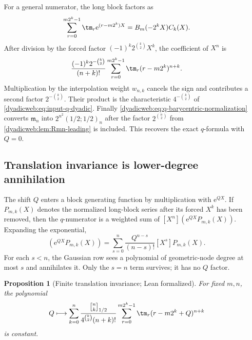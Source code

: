 \documentclass[11pt,oneside]{article}
\newtheorem{proposition}[proposition]{Proposition}
\theoremstyle{definition}
\theoremstyle{remark}
\newcommand{\e}{\mathrm e}
\newcommand{\qbinom}[3]{\genfrac{[}{]}{0pt}{}{#1}{#2}_{#3}}
\begin{document}
For a general numerator, the long block factors as
\begin{equation}
 \sum_{r=0}^{m2^k-1}\tm_r\e^{(r-m2^k)X}
 =B_m(-2^kX)C_k(X).                                       \label{dyadicweb:eq:long-block-local}
\end{equation}
After division by the forced factor
$(-1)^k2^{\binom k2}X^k$, the coefficient of $X^n$ is
\begin{equation}
 \frac{(-1)^k2^{-\binom k2}}{(n+k)!}
 \sum_{r=0}^{m2^k-1}\tm_r(r-m2^k)^{n+k}.                 \label{dyadicweb:eq:node-value-power-sum}
\end{equation}
Multiplication by the interpolation weight $w_{n,k}$ cancels the sign and contributes a
second factor $2^{-\binom k2}$.  Their product is the characteristic
$4^{-\binom k2}$ of \eqref{dyadicweb:eq:input-q-dyadic}.  Finally
\eqref{dyadicweb:eq:q-barycentric-normalization} converts $\mathfrak m_n$ into
$2^{n^2}(1/2;1/2)_n$ after the factor $2^{\binom n2}$ from
\cref{dyadicweb:lem:Rmn-leading} is included.  This recovers the exact $q$-formula with $Q=0$.

\subsection{Translation invariance is lower-degree annihilation}

The shift $Q$ enters a block generating function by multiplication with $\e^{QX}$.  If
\(
 P_{m,k}(X)
\)
denotes the normalized long-block series after its forced $X^k$ has been removed, then the
$q$-numerator is a weighted sum of $[X^n](\e^{QX}P_{m,k}(X))$.  Expanding the exponential,
\begin{equation}
 [X^n](\e^{QX}P_{m,k}(X))
 =\sum_{s=0}^{n}\frac{Q^{n-s}}{(n-s)!}[X^s]P_{m,k}(X).     \label{dyadicweb:eq:Q-expansion}
\end{equation}
For each $s<n$, the Gaussian row sees a polynomial of geometric-node degree at most $s$ and
annihilates it.  Only the $s=n$ term survives; it has no $Q$ factor.

\begin{proposition}[Finite translation invariance; Lean formalized]
\label{dyadicweb:prop:finite-Q-invariance}
For fixed $m,n$, the polynomial
\begin{equation}
 Q\longmapsto
 \sum_{k=0}^{n}
 \frac{\qbinom nk{1/2}}{4^{\binom k2}(n+k)!}
 \sum_{r=0}^{m2^k-1}\tm_r(r-m2^k+Q)^{n+k}                 \label{dyadicweb:eq:Q-polynomial}
\end{equation}
is constant.
\end{proposition}
\end{document}
